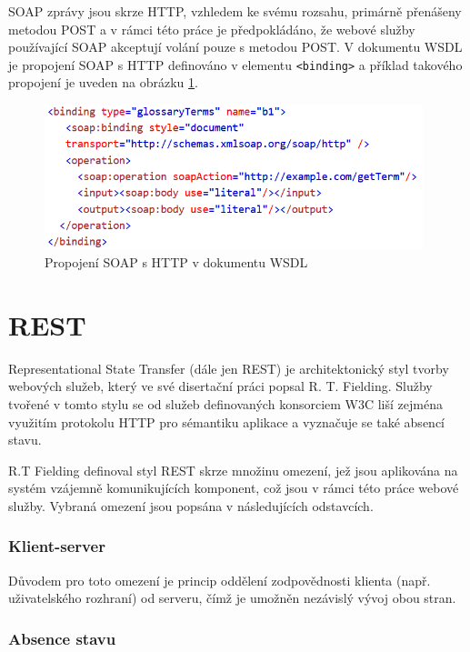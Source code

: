 \documentclass[czech,DP]{thesiskiv}
\begin{document}
SOAP zprávy jsou skrze HTTP, vzhledem ke svému rozsahu, primárně přenášeny metodou POST a v rámci této práce je předpokládáno, že webové služby používající SOAP akceptují volání pouze s metodou POST. V dokumentu WSDL je propojení SOAP s HTTP definováno v elementu \verb|<binding>| a příklad takového propojení je uveden na obrázku \ref{fig:soap-http-binding}.

\begin{figure}[h]
	\centering
	\includegraphics[width=11cm]{soap-http-binding}
	\caption{Propojení SOAP s HTTP v dokumentu WSDL}
	\label{fig:soap-http-binding}
\end{figure}


\section{REST}
\label{sec:rest}

%

Representational State Transfer (dále jen REST) je architektonický styl tvorby webových služeb, který ve své disertační práci \cite{fielding2000rest} popsal R. T. Fielding. Služby tvořené v tomto stylu se od služeb definovaných konsorciem W3C liší zejména využitím protokolu HTTP pro sémantiku aplikace a vyznačuje se také absencí stavu. 

R.T Fielding definoval styl REST skrze množinu omezení, jež jsou aplikována na systém vzájemně komunikujících komponent, což jsou v rámci této práce webové služby. Vybraná omezení jsou popsána v následujících odstavcích.

\subsubsection{Klient-server}
Důvodem pro toto omezení je princip oddělení zodpovědnosti klienta (např. uživatelského rozhraní) od serveru, čímž je umožněn nezávislý vývoj  obou stran.

\subsubsection{Absence stavu}
\end{document}
